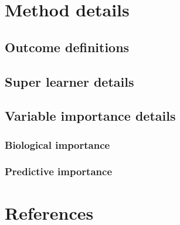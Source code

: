 \documentclass[]{article}
\begin{document}
\section{Method details}\label{sec:methods}

\subsection{Outcome definitions}\label{sec:outcomedefs}

\subsection{Super learner details}\label{sec:sldetails}

\subsection{Variable importance
details}\label{variable-importance-details}

\subsubsection{Biological importance}\label{sec:biolimp}

\subsubsection{Predictive importance}\label{predictive-importance}

\section{References}\label{sec:refs}


\end{document}
